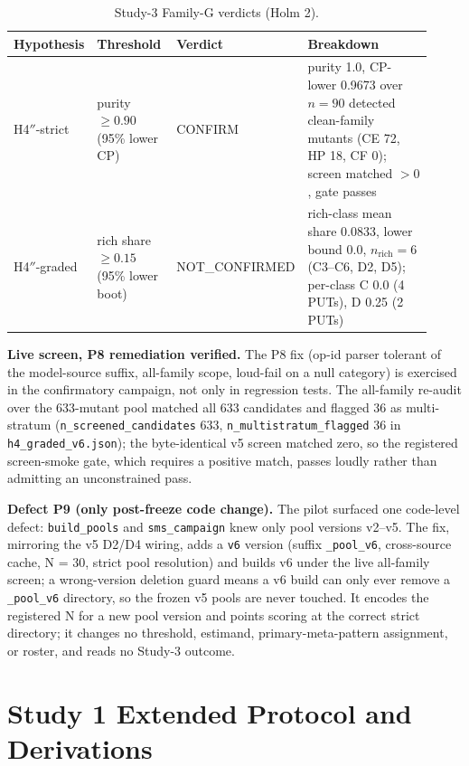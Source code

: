 \documentclass[manuscript,screen,review]{acmart}
\begin{document}
{%
\small
\begin{longtable}[]{@{}p{0.13\linewidth}p{0.20\linewidth}p{0.14\linewidth}p{0.45\linewidth}@{}}
\caption{Study-3 Family-G verdicts (Holm 2).}\label{tab:study3-verdicts}\\
\toprule\noalign{}
Hypothesis & Threshold & Verdict & Breakdown \\
\midrule\noalign{}
\endfirsthead
\endhead
\bottomrule\noalign{}
\endlastfoot
H4\('' \)-strict & purity $\geq 0.90$ (95\% lower CP) & CONFIRM & purity 1.0,
CP-lower 0.9673 over $n = 90$ detected clean-family mutants (CE 72, HP 18, CF 0);
screen matched $>0$, gate passes \\
H4\('' \)-graded & rich share $\geq 0.15$ (95\% lower boot) & NOT\_CONFIRMED &
rich-class mean share 0.0833, lower bound 0.0, $n_{\mathrm{rich}} = 6$
(C3--C6, D2, D5); per-class C 0.0 (4 PUTs), D 0.25 (2 PUTs) \\
\end{longtable}
\normalsize
}

\textbf{Live screen, P8 remediation verified.} The P8 fix (op-id parser
tolerant of the model-source suffix, all-family scope, loud-fail on a null
category) is exercised in the confirmatory campaign, not only in regression
tests. The all-family re-audit over the 633-mutant pool matched all 633
candidates and flagged 36 as multi-stratum
(\texttt{n\_screened\_candidates} 633, \texttt{n\_multistratum\_flagged} 36 in
\texttt{h4\_graded\_v6.json}); the byte-identical v5 screen matched zero, so the
registered screen-smoke gate, which requires a positive match, passes loudly
rather than admitting an unconstrained pass.

\textbf{Defect P9 (only post-freeze code change).} The pilot surfaced one
code-level defect: \texttt{build\_pools} and \texttt{sms\_campaign} knew only
pool versions v2--v5. The fix, mirroring the v5 D2/D4 wiring, adds a \texttt{v6}
version (suffix \texttt{\_pool\_v6}, cross-source cache, N = 30, strict pool
resolution) and builds v6 under the live all-family screen; a wrong-version
deletion guard means a v6 build can only ever remove a \texttt{\_pool\_v6}
directory, so the frozen v5 pools are never touched. It encodes the registered N
for a new pool version and points scoring at the correct strict directory; it
changes no threshold, estimand, primary-meta-pattern assignment, or roster, and
reads no Study-3 outcome.

\section{Study 1 Extended Protocol and Derivations}\label{k.-study1-extended-protocol-and-derivations}
\end{document}
